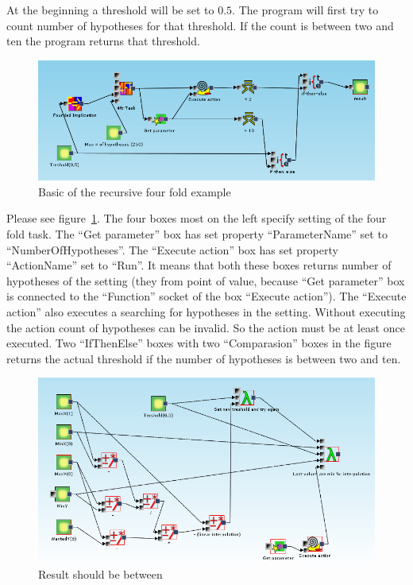 \documentclass[a4paper,12pt]{book}
\begin{document}
At the beginning a threshold will be set to $0.5$. The program will first try to count number of hypotheses for that threshold. If the count is between two and ten the program returns that threshold.   

\begin{figure}
	\includegraphics[width=1\textwidth]{exampleMainMiningPart}
	\caption{Basic of the recursive four fold example}
	\label{fig:basicRecursiveExample}
\end{figure}

Please see figure~\ref{fig:basicRecursiveExample}. The four boxes most on the left specify setting of the four fold task. The ``Get parameter'' box has set property ``ParameterName'' set to ``NumberOfHypotheses''. The ``Execute action'' box has set property ``ActionName'' set to ``Run''. It means that both these boxes returns number of hypotheses of the setting (they from point of value, because ``Get parameter'' box is connected to the ``Function'' socket of the box ``Execute action''). The ``Execute action'' also executes a searching for hypotheses in the setting. Without executing the action count of hypotheses can be invalid. So the action must be at least once executed. Two ``IfThenElse'' boxes with two ``Comparasion'' boxes in the figure returns the actual threshold if the number of hypotheses is between two and ten.

\begin{figure}
	\includegraphics[width=1\textwidth]{exampleMainRecursionPart}
	\caption{Result should be between}
	\label{fig:resultBetween}
\end{figure}
\end{document}
